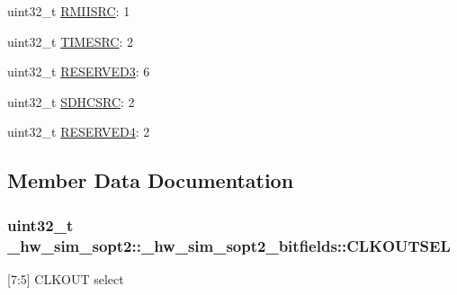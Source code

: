 \begin{DoxyCompactItemize}
\item 
uint32\+\_\+t \hyperlink{struct__hw__sim__sopt2_1_1__hw__sim__sopt2__bitfields_ad94472685aea586f1e51bd2cb22e0be9}{R\+M\+I\+I\+S\+RC}\+: 1
\item 
uint32\+\_\+t \hyperlink{struct__hw__sim__sopt2_1_1__hw__sim__sopt2__bitfields_a03f372a3a7728ec5f0764da4c4d54dfb}{T\+I\+M\+E\+S\+RC}\+: 2
\item 
uint32\+\_\+t \hyperlink{struct__hw__sim__sopt2_1_1__hw__sim__sopt2__bitfields_af7ce6a346d47da36cf9cb831a742f2c7}{R\+E\+S\+E\+R\+V\+E\+D3}\+: 6
\item 
uint32\+\_\+t \hyperlink{struct__hw__sim__sopt2_1_1__hw__sim__sopt2__bitfields_ac19c3d57f083a79a68b517ebfd433734}{S\+D\+H\+C\+S\+RC}\+: 2
\item 
uint32\+\_\+t \hyperlink{struct__hw__sim__sopt2_1_1__hw__sim__sopt2__bitfields_ae182d1fa243addcb2c5f7a1fd9561cdb}{R\+E\+S\+E\+R\+V\+E\+D4}\+: 2
\end{DoxyCompactItemize}


\subsection{Member Data Documentation}
\subsubsection[{\texorpdfstring{C\+L\+K\+O\+U\+T\+S\+EL}{CLKOUTSEL}}]{\setlength{\rightskip}{0pt plus 5cm}uint32\+\_\+t \+\_\+hw\+\_\+sim\+\_\+sopt2\+::\+\_\+hw\+\_\+sim\+\_\+sopt2\+\_\+bitfields\+::\+C\+L\+K\+O\+U\+T\+S\+EL}\hypertarget{struct__hw__sim__sopt2_1_1__hw__sim__sopt2__bitfields_a03a4f84d124df213c9aee2957192db60}{}\label{struct__hw__sim__sopt2_1_1__hw__sim__sopt2__bitfields_a03a4f84d124df213c9aee2957192db60}
\mbox{[}7\+:5\mbox{]} C\+L\+K\+O\+UT select 

